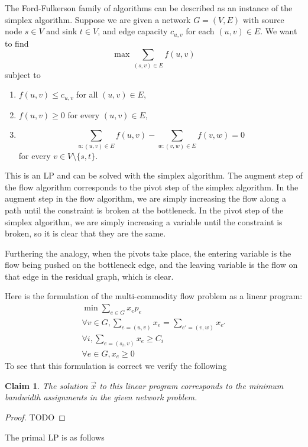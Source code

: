 \documentclass{article}
\newcommand{\problem}[1]{\noindent {\bf #1}}
\newcommand{\problempart}[1]{\noindent{\textbf{(#1)}}}
\newtheorem*{claim}{Claim}
\begin{document}
\problem{Problem 1.}

The Ford-Fulkerson family of algorithms can be described as an instance of the simplex algorithm. Suppose we are given a network $G=(V,E)$ with source node $s\in V$ and sink $t\in V$, and edge capacity $c_{u,v}$ for each $(u,v)\in E$. We want to find
\[\max \sum_{(s,v)\in E} f(u,v)\]
subject to
\begin{enumerate}
\item $f(u,v)\leq c_{u,v}$ for all $(u,v)\in E$,
\item $f(u,v)\geq 0$ for every $(u,v)\in E$,
\item
\[\sum_{u:(u,v)\in E} f(u,v) - \sum_{w:(v,w)\in E} f(v,w) = 0\]
for every $v\in V\setminus\{s,t\}$.
\end{enumerate}

This is an LP and can be solved with the simplex algorithm. The augment step of the flow algorithm corresponds to the pivot step of the simplex algorithm. In the augment step in the flow algorithm, we are simply increasing the flow along a path until the constraint is broken at the bottleneck. In the pivot step of the simplex algorithm, we are simply increasing a variable until the constraint is broken, so it is clear that they are the same.

Furthering the analogy, when the pivots take place, the entering variable is the flow being pushed on the bottleneck edge, and the leaving variable is the flow on that edge in the residual graph, which is clear.

\problem{Problem 2.} 

\problempart{a} Here is the formulation of the multi-commodity flow problem as a linear program:
\begin{align*}
\min \sum_{e\in G} x_ep_e \\
\forall v \in G, \sum_{e = (u,v)} x_e = \sum_{e' = (v,w)} x_{e'} \\
\forall i, \sum_{e = (s_i, v)} x_e \geq C_i \\
\forall e \in G, x_e \geq 0
\end{align*}
To see that this formulation is correct we verify the following
\begin{claim}
The solution $\vec{x}$ to this linear program corresponds to the minimum bandwidth assignments in the given network problem. 
\end{claim}
\begin{proof}
TODO
\end{proof}

\problempart{b}
The primal LP is as follows
\end{document}
